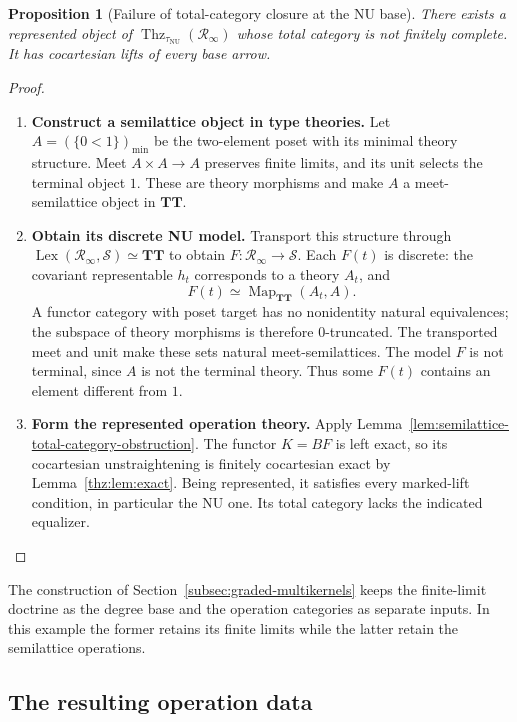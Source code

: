 \documentclass[oneside]{article}
\theoremstyle{plain}
\newtheorem{proposition}[theorem]{Proposition}
\theoremstyle{definition}
\theoremstyle{remark}
\newcommand{\Lex}{\operatorname{Lex}}
\newcommand{\Map}{\operatorname{Map}}
\newcommand{\NU}{\mathrm{NU}}
\newcommand{\RNU}{\mathcal R_{\infty}}
\newcommand{\Sps}{\mathcal S}
\newcommand{\TT}{\mathbf{TT}}
\newcommand{\Thz}{\operatorname{Thz}}
\newcommand{\minrep}{\mathrm{min}}
\begin{document}
\begin{proposition}[Failure of total-category closure at the NU base]
\label{prop:NU-total-category-obstruction}
There exists a represented object of
$\Thz_{\tau_{\NU}}(\RNU)$ whose total category is not finitely
complete. It has cocartesian lifts of every base arrow.
\end{proposition}
\begin{proof}
\leavevmode
\begin{enumerate}
\item \textbf{Construct a semilattice object in type theories.}
Let $A=(\{0<1\})_{\minrep}$ be the two-element poset with its minimal
theory structure. Meet $A\times A\to A$ preserves finite limits, and
its unit selects the terminal object $1$. These are theory morphisms
and make $A$ a meet-semilattice object in $\TT$.


\item \textbf{Obtain its discrete NU model.}
Transport this structure through
$\Lex(\RNU,\Sps)\simeq\TT$ to obtain $F:\RNU\to\Sps$.
Each $F(t)$ is discrete: the covariant representable $h_t$ corresponds
to a theory $A_t$, and
\[
 F(t)\simeq\Map_{\TT}(A_t,A).
\]
A functor category with poset target has no nonidentity natural
equivalences; the subspace of theory morphisms is therefore
$0$-truncated. The transported meet and unit make these sets natural
meet-semilattices. The model $F$ is not terminal, since $A$ is not the
terminal theory. Thus some $F(t)$ contains an element different from $1$.


\item \textbf{Form the represented operation theory.}
Apply Lemma~\ref{lem:semilattice-total-category-obstruction}.
The functor $K=BF$ is left exact, so its cocartesian unstraightening is
finitely cocartesian exact by Lemma~\ref{thz:lem:exact}. Being
represented, it satisfies every marked-lift condition, in particular the
NU one. Its total category lacks the indicated equalizer.
\qedhere
\end{enumerate}
\end{proof}

The construction of Section~\ref{subsec:graded-multikernels} keeps the
finite-limit doctrine as the degree base and the operation categories
as separate inputs. In this example the former retains its finite
limits while the latter retain the semilattice operations.

\subsection{The resulting operation data}
\label{subsec:comparison-higher-theories}
\end{document}
